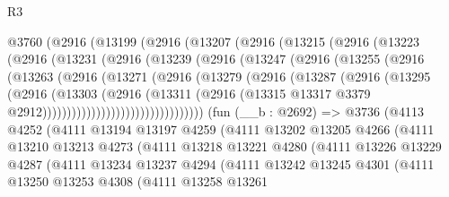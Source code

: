 \begin{lexlean}{R3}
\begin{coremodule}
    @3760
      (@2916
        (@13199
          (@2916
            (@13207
              (@2916
                (@13215
                  (@2916
                    (@13223
                      (@2916
                        (@13231
                          (@2916
                            (@13239
                              (@2916
                                (@13247
                                  (@2916
                                    (@13255
                                      (@2916
                                        (@13263
                                          (@2916
                                            (@13271
                                              (@2916
                                                (@13279
                                                  (@2916
                                                    (@13287
                                                      (@2916
                                                        (@13295
                                                          (@2916
                                                            (@13303
                                                              (@2916
                                                                (@13311
                                                                  (@2916
                                                                    (@13315
                                                                      @13317
                                                                      @3379
                                                                      @2912)))))))))))))))))))))))))))))))))
    (fun (__b : @2692) =>
    @3736
      (@4113
        @4252
        (@4111
          @13194
          @13197
          @4259
          (@4111
            @13202
            @13205
            @4266
            (@4111
              @13210
              @13213
              @4273
              (@4111
                @13218
                @13221
                @4280
                (@4111
                  @13226
                  @13229
                  @4287
                  (@4111
                    @13234
                    @13237
                    @4294
                    (@4111
                      @13242
                      @13245
                      @4301
                      (@4111
                        @13250
                        @13253
                        @4308
                        (@4111
                          @13258
                          @13261

\end{coremodule}
\end{lexlean}
